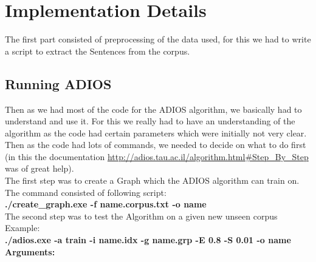 \documentclass{article}
\begin{document}
\section{Implementation Details}
The first part consisted of preprocessing of the data used, for this we had to write a script to extract the Sentences from the corpus. 
\subsection{Running ADIOS}
Then as we had most of the code for the ADIOS algorithm, we basically had to understand and use it. For this we really had to have an
understanding of the algorithm as the code had certain parameters which were initially not very clear. Then as the code had lots of
commands, we needed to decide on what to do first (in this the documentation \url{http://adios.tau.ac.il/algorithm.html#Step_By_Step}
was of great help).\\
The first step was to create a Graph which the ADIOS algorithm can train on.\\
The command consisted of following script:\\

{\bf  ./create\_graph.exe -f name.corpus.txt -o name} \\

The second step was to test the Algorithm on a given new unseen corpus \\
Example: \\
{\bf ./adios.exe -a train -i name.idx -g name.grp -E 0.8 -S 0.01 -o name} \\

{\bf Arguments:}\\
\end{document}
